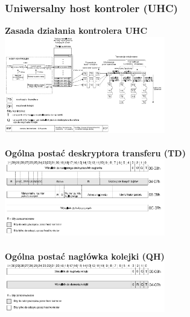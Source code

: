 	\subsubsection{Uniwersalny host kontroler (UHC)}
	\textbf{Zasada działania kontrolera UHC}\\
	\includegraphics[width=7cm]{./wyklady/USB_46_1.pdf}\\\\
	\textbf{Ogólna postać deskryptora transferu (TD)}\\
	\includegraphics[width=7cm]{./wyklady/USB_47_1.pdf}\\\\
	\textbf{Ogólna postać nagłówka kolejki (QH)}\\
	\includegraphics[width=7cm]{./wyklady/USB_48_1.pdf}
